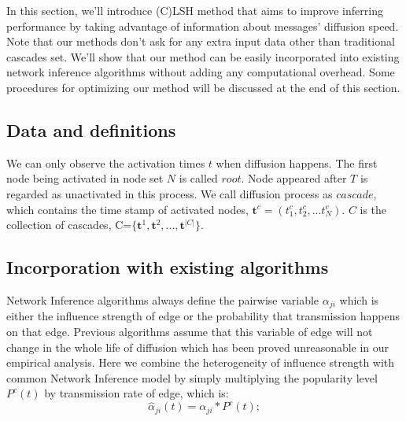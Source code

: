 \quad In this section, we'll introduce (C)LSH method that aims to improve inferring performance by taking advantage of information about messages' diffusion speed. Note that our methods don't ask for any extra input data other than traditional cascades set. We'll show that our method can be easily incorporated into existing network inference algorithms without adding any computational overhead. Some procedures for optimizing our method will be discussed at the end of this section.
\subsection{Data and definitions}
\quad We can only observe the activation times $t$ when diffusion happens. The first node being activated in node set $N$ is called $root$. Node appeared after $T$ is regarded as unactivated in this process. We call diffusion process as $cascade$, which contains the time stamp of activated nodes, $\textbf{t}^c=(t_1^c,t_2^c,...t_N^c)$. $C$ is the collection of cascades, C=$\{\textbf{t}^1,\textbf{t}^2,...,\textbf{t}^{|C|}\}$.
\subsection{Incorporation with existing algorithms}
\quad Network Inference algorithms always define the pairwise variable $\alpha_{ji}$ which is either the influence strength of edge or the probability that transmission happens on that edge. Previous algorithms assume that this variable of edge will not change in the whole life of diffusion which has been proved unreasonable in our empirical analysis. Here we combine the heterogeneity of influence strength with common Network Inference model by simply multiplying the popularity level $P^c(t)$ by transmission rate of edge, which is:
\begin{equation}
\hat{\alpha}_{ji}(t)=\alpha_{ji}*P^c(t);\label{eq:alphaT}
\end{equation}

